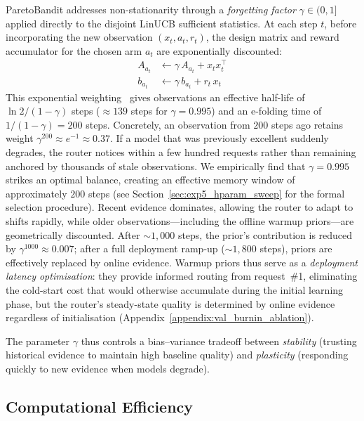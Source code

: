 ParetoBandit addresses non-stationarity through a \emph{forgetting factor} $\gamma \in (0, 1]$ applied directly to the disjoint LinUCB sufficient statistics. At each step $t$, before incorporating the new observation $(x_t, a_t, r_t)$, the design matrix and reward accumulator for the chosen arm $a_t$ are exponentially discounted:
\begin{align}
    A_{a_t} &\leftarrow \gamma \, A_{a_t} + x_t x_t^\top
    \label{eq:forget_A} \\
    b_{a_t} &\leftarrow \gamma \, b_{a_t} + r_t \, x_t
    \label{eq:forget_b}
\end{align}
This exponential weighting~\cite{garivier2011switching} gives observations an effective half-life of $\ln 2 / (1 - \gamma)$ steps (${\approx}139$ steps for $\gamma{=}0.995$) and an e-folding time of $1/(1-\gamma){=}200$ steps.  Concretely, an observation from $200$ steps ago retains weight $\gamma^{200} \approx e^{-1} \approx 0.37$.  If a model that was previously excellent suddenly degrades, the router notices within a few hundred requests rather than remaining anchored by thousands of stale observations.  We empirically find that $\gamma=0.995$ strikes an optimal balance, creating an effective memory window of approximately $200$ steps (see Section~\ref{sec:exp5_hparam_sweep} for the formal selection procedure). Recent evidence dominates, allowing the router to adapt to shifts rapidly, while older observations---including the offline warmup priors---are geometrically discounted.  After ${\sim}1{,}000$ steps, the prior's contribution is reduced by $\gamma^{1000} \approx 0.007$; after a full deployment ramp-up (${\sim}1{,}800$ steps), priors are effectively replaced by online evidence.  Warmup priors thus serve as a \emph{deployment latency optimisation}: they provide informed routing from request~\#1, eliminating the cold-start cost that would otherwise accumulate during the initial learning phase, but the router's steady-state quality is determined by online evidence regardless of initialisation (Appendix~\ref{appendix:val_burnin_ablation}).

The parameter $\gamma$ thus controls a bias--variance tradeoff between \emph{stability} (trusting historical evidence to maintain high baseline quality) and \emph{plasticity} (responding quickly to new evidence when models degrade).

\subsection{Computational Efficiency}
\label{sec:efficiency}

